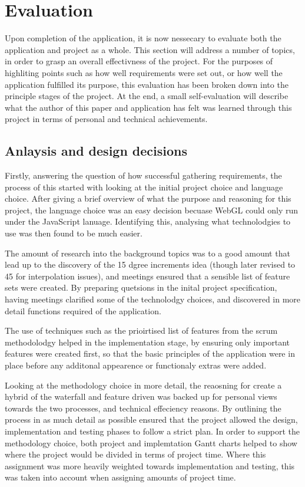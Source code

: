 \chapter{Evaluation}
Upon completion of the application, it is now nessecary to evaluate both the application and project as a whole. This section will address a number of topics, in order to grasp an overall effectivness of the project. For the purposes of highliting points such as how well requirements were set out, or how well the application fulfilled its purpose, this evaluation has been broken down into the principle stages of the project. At the end, a small self-evaluation will describe what the author of this paper and application has felt was learned through this project in terms of personal and technical achievements.

\section{Anlaysis and design decisions}
Firstly, answering the question of how successful gathering requirements, the process of this started with looking at the initial project choice and language choice. After giving a brief overview of what the purpose and reasoning for this project, the language choice was an easy decision becuase WebGL could only run under the JavaScript lanuage. Identifying this, analysing what technolodgies to use was then found to be much easier. 

The amount of research into the background topics was to a good amount that lead up to the discovery of the 15 dgree increments idea (though later revised to 45 for interpolation issues), and meetings ensured that a sensible list of feature sets were created. By preparing quetsions in the inital project specification, having meetings clarified some of the technolodgy choices, and discovered in more detail functions required of the application.

The use of techniques such as the prioirtised list of features from the scrum methodolodgy helped in the implementation stage, by ensuring only important features were created first, so that the basic principles of the application were in place before any additonal appearence or functionaly extras were added.

Looking at the methodology choice in more detail, the reaosning for create a hybrid of the waterfall and feature driven was backed up for personal views towards the two processes, and technical effeciency reasons. By outlining the process in as much detail as possible ensured that the project allowed the design, implementation and testing phases to follow a strict plan. In order to support the methodology choice, both project and implemtation Gantt charts helped to show where the project would be divided in terms of project time. Where this assignment was more heavily weighted towards implementation and testing, this was taken into account when assigning amounts of project time.

